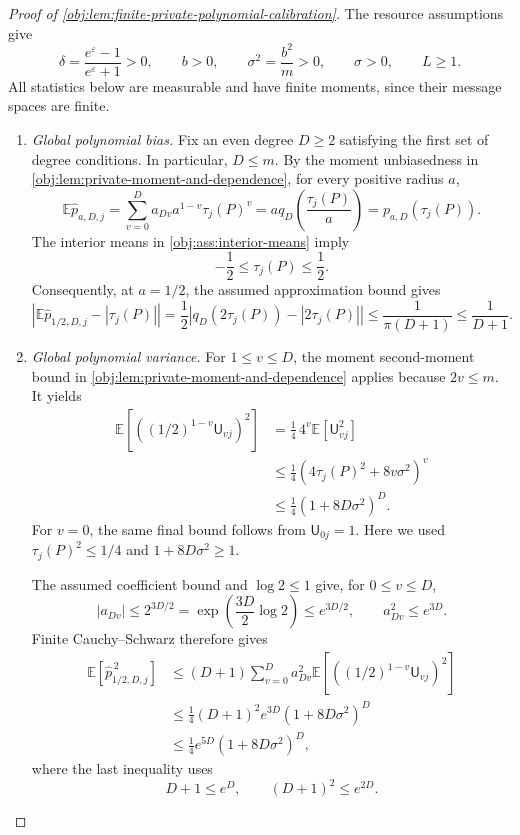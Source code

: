 \begin{proof}[Proof of \cref{obj:lem:finite-private-polynomial-calibration}]
The resource assumptions give
\[
\delta=\frac{e^\varepsilon-1}{e^\varepsilon+1}>0,
\qquad b>0,
\qquad \sigma^2=\frac{b^2}{m}>0,
\qquad \sigma>0,
\qquad L\ge1.
\]
All statistics below are measurable and have finite moments, since their message spaces are finite.

\begin{enumerate}
\item \textit{Global polynomial bias.}
Fix an even degree \(D\ge2\) satisfying the first set of degree conditions. In particular, \(D\le m\). By the moment unbiasedness in \cref{obj:lem:private-moment-and-dependence}, for every positive radius \(a\),
\[
\mathbb E\widehat p_{a,D,j}
=\sum_{v=0}^D a_{Dv}a^{1-v}\tau_j(P)^v
=a q_D\!\left(\frac{\tau_j(P)}a\right)
=p_{a,D}(\tau_j(P)).
\]
The interior means in \cref{obj:ass:interior-means} imply
\[
-\frac12\le\tau_j(P)\le\frac12.
\]
Consequently, at \(a=1/2\), the assumed approximation bound gives
\[
\left|\mathbb E\widehat p_{1/2,D,j}-|\tau_j(P)|\right|
=\frac12\left|q_D(2\tau_j(P))-|2\tau_j(P)|\right|
\le\frac1{\pi(D+1)}
\le\frac1{D+1}.
\]

\item \textit{Global polynomial variance.}
For \(1\le v\le D\), the moment second-moment bound in \cref{obj:lem:private-moment-and-dependence} applies because \(2v\le m\). It yields
\[
\begin{aligned}
\mathbb E\left[\left((1/2)^{1-v}\mathsf U_{vj}\right)^2\right]
&=\frac14\,4^v\mathbb E[\mathsf U_{vj}^2]\\
&\le\frac14\left(4\tau_j(P)^2+8v\sigma^2\right)^v\\
&\le\frac14(1+8D\sigma^2)^D.
\end{aligned}
\]
For \(v=0\), the same final bound follows from \(\mathsf U_{0j}=1\). Here we used \(\tau_j(P)^2\le1/4\) and \(1+8D\sigma^2\ge1\).

The assumed coefficient bound and \(\log2\le1\) give, for \(0\le v\le D\),
\[
|a_{Dv}|
\le 2^{3D/2}
=\exp\!\left(\frac{3D}{2}\log2\right)
\le e^{3D/2},
\qquad
a_{Dv}^2\le e^{3D}.
\]
Finite Cauchy--Schwarz therefore gives
\[
\begin{aligned}
\mathbb E[\widehat p_{1/2,D,j}^{\,2}]
&\le(D+1)\sum_{v=0}^D
 a_{Dv}^2
 \mathbb E\left[\left((1/2)^{1-v}\mathsf U_{vj}\right)^2\right]\\
&\le\frac14(D+1)^2e^{3D}(1+8D\sigma^2)^D\\
&\le\frac14e^{5D}(1+8D\sigma^2)^D,
\end{aligned}
\]
where the last inequality uses
\[
D+1\le e^D,
\qquad (D+1)^2\le e^{2D}.
\]


\end{enumerate}
\end{proof}
